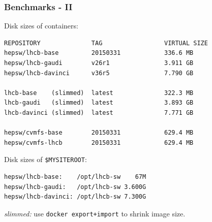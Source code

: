 \documentclass[9pt]{beamer}
\begin{document}
\begin{frame}[fragile]
  \frametitle{Benchmarks - II}

  \begin{block}{}
    Disk sizes of containers:
        \begin{verbatim}
REPOSITORY              TAG                 VIRTUAL SIZE
hepsw/lhcb-base         20150331            336.6 MB
hepsw/lhcb-gaudi        v26r1               3.911 GB
hepsw/lhcb-davinci      v36r5               7.790 GB

lhcb-base    (slimmed)  latest              322.3 MB
lhcb-gaudi   (slimmed)  latest              3.893 GB
lhcb-davinci (slimmed)  latest              7.771 GB

hepsw/cvmfs-base        20150331            629.4 MB
hepsw/cvmfs-lhcb        20150331            629.4 MB
        \end{verbatim}
  \end{block}

  \begin{block}{}
    Disk sizes of \texttt{\$MYSITEROOT}:
    \begin{verbatim}
hepsw/lhcb-base:    /opt/lhcb-sw    67M
hepsw/lhcb-gaudi:   /opt/lhcb-sw 3.600G
hepsw/lhcb-davinci: /opt/lhcb-sw 7.300G
    \end{verbatim}
  \end{block}

  \emph{slimmed:} use \texttt{docker export+import} to shrink image size.
\end{frame}
\end{document}
